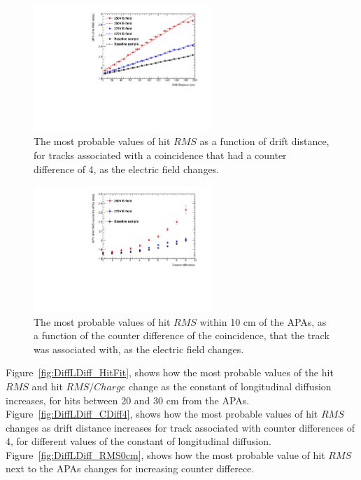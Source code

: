 \begin{figure}[h!]
  \centering
  \includegraphics[width=0.6\textwidth]{Canvas_CountDiff4_All_Positions_ElecField}
  \caption[The drift distance dependence of diffusion in the 35 ton dataset and Monte Carlo for coincidences with a counter difference of 4, as the electric field changes]
          {The most probable values of hit $RMS$ as a function of drift distance, for tracks associated with a coincidence that had a counter difference of 4, as the electric field changes.}
  \label{fig:DiffElecStudy_CDiff4}
\end{figure}

\begin{figure}[h!]
  \centering
  \includegraphics[width=0.6\textwidth]{Canvas_All_Angles_RMS0cm_ElecField}
  \caption[The angular dependence of diffusion in the 35 ton dataset and Monte Carlo for hits within 10 cm of the APAs, as the electric field changes]
          {The most probable values of hit $RMS$ within 10 cm of the APAs, as a function of the counter difference of the coincidence, that the track was associated with, as the electric field changes.}
  \label{fig:DiffElecStudy_RMS0cm}
\end{figure}

Figure~\ref{fig:DiffLDiff_HitFit}, shows how the most probable values of the hit $RMS$ and hit $RMS/Charge$ change as the constant of longitudinal diffusion increases, for hits between 20 and 30 cm from the APAs. Figure~\ref{fig:DiffLDiff_CDiff4}, shows how the most probable values of hit $RMS$ changes as drift distance increases for track associated with counter differences of 4, for different values of the constant of longitudinal diffusion. Figure~\ref{fig:DiffLDiff_RMS0cm}, shows how the most probable value of hit $RMS$ next to the APAs changes for increasing counter differece. \\ 

